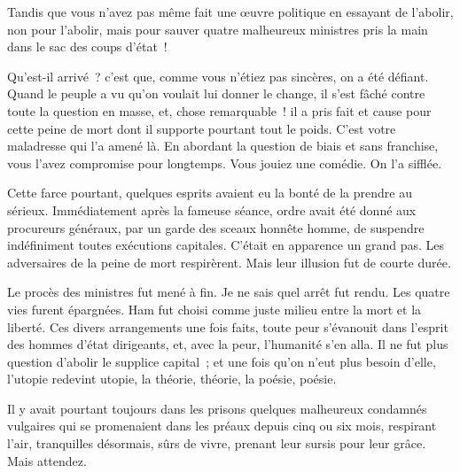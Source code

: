 \documentclass[french,twoside]{book} %
\begin{document}
Tandis que vous n’avez pas même fait une œuvre politique en essayant de l’abolir, non pour l’abolir, mais pour sauver quatre malheureux ministres pris la main dans le sac des coups d’état !\par
Qu’est-il arrivé ? c’est que, comme vous n’étiez pas sincères, on a été défiant. Quand le peuple a vu qu’on voulait lui donner le change, il s’est fâché contre toute la question en masse, et, chose remarquable ! il a pris fait et cause pour cette peine de mort dont il supporte pourtant tout le poids. C’est votre maladresse qui l’a amené là. En abordant la question de biais et sans franchise, vous l’avez compromise pour longtemps. Vous jouiez une comédie. On l’a sifflée.\par
Cette farce pourtant, quelques esprits avaient eu la bonté de la prendre au sérieux. Immédiatement après la fameuse séance, ordre avait été donné aux procureurs généraux, par un garde des sceaux honnête homme, de suspendre indéfiniment toutes exécutions capitales. C’était en  apparence un grand pas. Les adversaires de la peine de mort respirèrent. Mais leur illusion fut de courte durée.\par
Le procès des ministres fut mené à fin. Je ne sais quel arrêt fut rendu. Les quatre vies furent épargnées. Ham fut choisi comme juste milieu entre la mort et la liberté. Ces divers arrangements une fois faits, toute peur s’évanouit dans l’esprit des hommes d’état dirigeants, et, avec la peur, l’humanité s’en alla. Il ne fut plus question d’abolir le supplice capital ; et une fois qu’on n’eut plus besoin d’elle, l’utopie redevint utopie, la théorie, théorie, la poésie, poésie.\par
Il y avait pourtant toujours dans les prisons quelques malheureux condamnés vulgaires qui se promenaient dans les préaux depuis cinq ou six mois, respirant l’air, tranquilles désormais, sûrs de vivre, prenant leur sursis pour leur grâce. Mais attendez.\par
\end{document}
